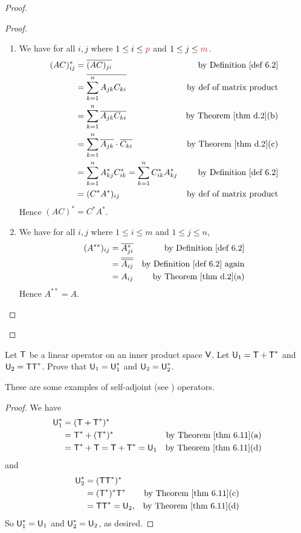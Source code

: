 \begin{proof}
\begin{enumerate}
\begin{proof}
\begin{enumerate}
\item We have for all \(i, j\) where \(1 \le i \le \RED{p}\) and \(1 \le j \le \RED{m}\).
\begin{align*}
    (AC)^*_{ij} & = \conjugatet{(AC)_{ji}} & \text{by \DEF{6.2}} \\
        & = \conjugatet{\sum_{k = 1}^n A_{jk}C_{ki}} & \text{by def of matrix product} \\
        & = \sum_{k = 1}^n \conjugatet{A_{jk}C_{ki}} & \text{by \THM{d.2}(b)} \\
        & = \sum_{k = 1}^n \conjugatet{A_{jk}} \cdot \conjugatet{C_{ki}} & \text{by \THM{d.2}(c)} \\
        & = \sum_{k = 1}^n A^*_{kj} C^*_{ik} = \sum_{k = 1}^n C^*_{ik} A^*_{kj} & \text{by \DEF{6.2}} \\
        & = (C^* A^*)_{ij} & \text{by def of matrix product}
\end{align*}
Hence \((AC)^* = C^*A^*\).

\item
We have for all \(i, j\) where \(1 \le i \le m\) and \(1 \le j \le n\),
\begin{align*}
    (A^{**})_{ij} & = \conjugatet{A^*_{ji}} & \text{by \DEF{6.2}} \\
        & = \conjugatet{\conjugatet{A_{ij}}} & \text{by \DEF{6.2} again} \\
        & = A_{ij} & \text{by \THM{d.2}(a)}
\end{align*}
Hence \(A^{**} = A\).
\end{enumerate}
\end{proof}

\end{enumerate}
\end{proof}

\begin{exercise} \label{exercise 6.3.6}
Let \(\textsf{T}\) be a linear operator on an inner product space \(\textsf{V}\).
Let \(\textsf{U}_1 = \textsf{T} + \textsf{T}^*\) and \(\textsf{U}_2 = \textsf{T}\textsf{T}^*\).
Prove that \(\textsf{U}_1 = \textsf{U}_1^*\) and \(\textsf{U}_2 = \textsf{U}_2^*\).
\end{exercise}

\begin{note}
These are some examples of self-adjoint (see ) operators.
\end{note}

\begin{proof}
We have
\begin{align*}
    \U_1^* & = (\T + \T^*)^* \\
        & = \T^* + (\T^*)^* & \text{by \THM{6.11}(a)} \\
        & = \T^* + \T = \T + \T^* = \U_1 & \text{by \THM{6.11}(d)}
\end{align*}
and
\begin{align*}
    \U_2^* & = (\T\T^*)^* \\
        & = (\T^*)^* \T^* & \text{by \THM{6.11}(c)} \\
        & = \T\T^* = \U_2, & \text{by \THM{6.11}(d)}
\end{align*}
So \(\textsf{U}_1^* = \textsf{U}_1\) and \(\textsf{U}_2^* = \textsf{U}_2\), as desired.
\end{proof}

